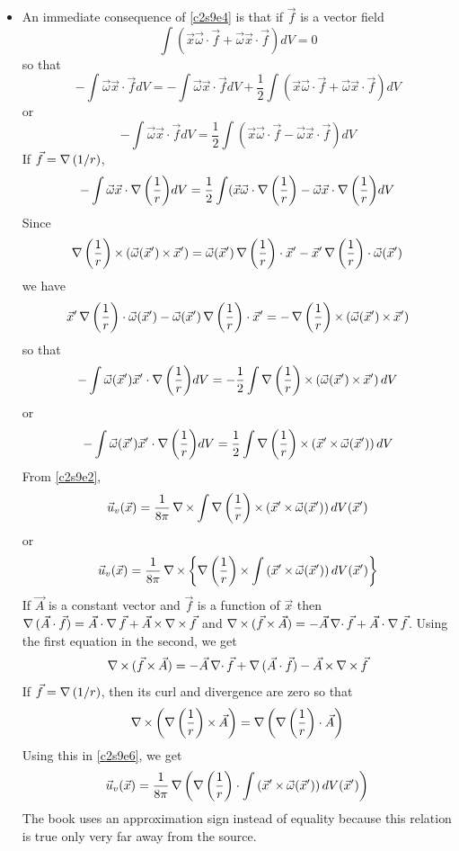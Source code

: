 \begin{itemize}
\item An immediate consequence of \eqref{c2s9e4} is that if $\vec{f}$ is a vector field 
\begin{equation}\label{c2s9e5}
\int(\vec{x}\vec{\omega}\cdot\vec{f} + \vec{\omega}\vec{x}\cdot\vec{f})dV = 0
\end{equation}
so that
\[
-\int \vec{\omega}\vec{x}\cdot\vec{f}dV = -\int \vec{\omega}\vec{x}\cdot\vec{f}dV + \frac{1}{2}\int(\vec{x}\vec{\omega}\cdot\vec{f} + \vec{\omega}\vec{x}\cdot\vec{f})dV
\]
or
\[
-\int \vec{\omega}\vec{x}\cdot\vec{f}dV = \frac{1}{2}\int(\vec{x}\vec{\omega}\cdot\vec{f} - \vec{\omega}\vec{x}\cdot\vec{f})dV
\]
If $\vec{f} = \operatorname{\nabla}{(1/r)}$,
\[
-\int \vec{\omega}\vec{x}\cdot\operatorname{\nabla}{\left(\frac{1}{r}\right)}dV = \frac{1}{2}\int(\vec{x}\vec{\omega}\cdot\operatorname{\nabla}{\left(\frac{1}{r}\right)} - 
\vec{\omega}\vec{x}\cdot\operatorname{\nabla}{\left(\frac{1}{r}\right)}dV
\]
Since
\[
\operatorname{\nabla}{\left(\frac{1}{r}\right)}\operatorname{\times}\left(\vec{\omega}(\vec{x}^\prime)\operatorname{\times}\vec{x}^\prime\right) = \vec{\omega}(\vec{x}^\prime)\operatorname{\nabla}{\left(\frac{1}{r}\right)}\cdot\vec{x}^\prime - 
\vec{x}^\prime\operatorname{\nabla}{\left(\frac{1}{r}\right)}\cdot\vec{\omega}(\vec{x}^\prime)
\]
we have
\[
\vec{x}^\prime\operatorname{\nabla}{\left(\frac{1}{r}\right)}\cdot\vec{\omega}(\vec{x}^\prime) - \vec{\omega}(\vec{x}^\prime)\operatorname{\nabla}{\left(\frac{1}{r}\right)}\cdot\vec{x}^\prime = 
-\operatorname{\nabla}{\left(\frac{1}{r}\right)}\operatorname{\times}\left(\vec{\omega}(\vec{x}^\prime)\operatorname{\times}\vec{x}^\prime\right)
\]
so that
\[
-\int\vec{\omega}(\vec{x}^\prime)\vec{x}^\prime\cdot\operatorname{\nabla}{\left(\frac{1}{r}\right)}dV = -\frac{1}{2}\int\operatorname{\nabla}{\left(\frac{1}{r}\right)}\operatorname{\times}\left(\vec{\omega}(\vec{x}^\prime)\operatorname{\times}\vec{x}^\prime\right)dV
\]
or
\[
-\int\vec{\omega}(\vec{x}^\prime)\vec{x}^\prime\cdot\operatorname{\nabla}{\left(\frac{1}{r}\right)}dV = \frac{1}{2}\int\operatorname{\nabla}{\left(\frac{1}{r}\right)}\operatorname{\times}\left(\vec{x}^\prime\operatorname{\times}\vec{\omega}(\vec{x}^\prime)\right)dV
\]
From \eqref{c2s9e2},
\[
\vec{u}_v(\vec{x}) = \frac{1}{8\pi}\operatorname{\nabla\operatorname{\times}}\int \operatorname{\nabla}{\left(\frac{1}{r}\right)}\operatorname{\times}\left(\vec{x}^\prime\operatorname{\times}\vec{\omega}(\vec{x}^\prime)\right) dV(\vec{x}^\prime)
\]
or
\begin{equation}\label{c2s9e6}
\vec{u}_v(\vec{x}) = \frac{1}{8\pi}\operatorname{\nabla\operatorname{\times}}\left\{\operatorname{\nabla}{\left(\frac{1}{r}\right)}\operatorname{\times}\int\left(\vec{x}^\prime\operatorname{\times}\vec{\omega}(\vec{x}^\prime)\right) dV(\vec{x}^\prime)\right\}
\end{equation}
If $\vec{A}$ is a constant vector and $\vec{f}$ is a function of $\vec{x}$ then $\operatorname{\nabla}{(\vec{A}\cdot\vec{f})} = \vec{A}\cdot\operatorname{\nabla}{\vec{f}} + \vec{A}\operatorname{\times}\operatorname{\nabla\operatorname{\times}}{\vec{f}}$ and
$\operatorname{\nabla\operatorname{\times}}{(\vec{f}\operatorname{\times}\vec{A})} = -\vec{A}\operatorname{\nabla\cdot}{\vec{f}} + \vec{A}\cdot\operatorname{\nabla}{\vec{f}}$. Using the first equation in the second, we get
\[
\operatorname{\nabla\operatorname{\times}}{(\vec{f}\operatorname{\times}\vec{A})} = -\vec{A}\operatorname{\nabla\cdot}{\vec{f}} + \operatorname{\nabla}{(\vec{A}\cdot\vec{f})} - \vec{A}\operatorname{\times}\operatorname{\nabla\operatorname{\times}}{\vec{f}}
\]
If $\vec{f} = \operatorname{\nabla}{(1/r)}$, then its curl and divergence are zero so that
\[
\operatorname{\nabla\operatorname{\times}}{\left(\operatorname{\nabla}{\left(\frac{1}{r}\right)}\operatorname{\times}\vec{A}\right)} = \operatorname{\nabla}{\left(\operatorname{\nabla}{\left(\frac{1}{r}\right)}\cdot\vec{A}\right)}
\]
Using this in \eqref{c2s9e6}, we get
\begin{equation}\label{c2s9e7}
\vec{u}_v(\vec{x}) = \frac{1}{8\pi}\operatorname{\nabla}{\left(\operatorname{\nabla}{\left(\frac{1}{r}\right)}\cdot\int\left(\vec{x}^\prime\operatorname{\times}\vec{\omega}(\vec{x}^\prime)\right) dV(\vec{x}^\prime)\right)}
\end{equation}
The book uses an approximation sign instead of equality because this relation is true only very far away from the source.


\end{itemize}

